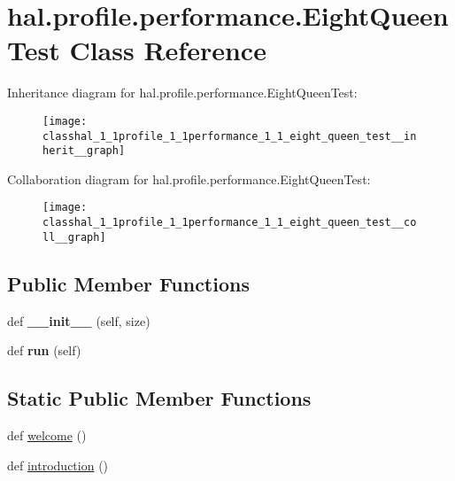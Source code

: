 \hypertarget{classhal_1_1profile_1_1performance_1_1_eight_queen_test}{}\section{hal.\+profile.\+performance.\+Eight\+Queen\+Test Class Reference}
\label{classhal_1_1profile_1_1performance_1_1_eight_queen_test}


Inheritance diagram for hal.\+profile.\+performance.\+Eight\+Queen\+Test\+:\nopagebreak
\begin{figure}[H]
\begin{center}
\leavevmode
\texttt{[image: classhal\_1\_1profile\_1\_1performance\_1\_1\_eight\_queen\_test\_\_inherit\_\_graph]}
\end{center}
\end{figure}


Collaboration diagram for hal.\+profile.\+performance.\+Eight\+Queen\+Test\+:\nopagebreak
\begin{figure}[H]
\begin{center}
\leavevmode
\texttt{[image: classhal\_1\_1profile\_1\_1performance\_1\_1\_eight\_queen\_test\_\_coll\_\_graph]}
\end{center}
\end{figure}
\subsection*{Public Member Functions}
\begin{DoxyCompactItemize}
\item 
def {\bfseries \+\_\+\+\_\+init\+\_\+\+\_\+} (self, size)\hypertarget{classhal_1_1profile_1_1performance_1_1_eight_queen_test_aff4c0640adbaf044ee1a2f1d20480647}{}\label{classhal_1_1profile_1_1performance_1_1_eight_queen_test_aff4c0640adbaf044ee1a2f1d20480647}

\item 
def {\bfseries run} (self)\hypertarget{classhal_1_1profile_1_1performance_1_1_eight_queen_test_a0f340ce684acbecc0ecec304907852c3}{}\label{classhal_1_1profile_1_1performance_1_1_eight_queen_test_a0f340ce684acbecc0ecec304907852c3}

\end{DoxyCompactItemize}
\subsection*{Static Public Member Functions}
\begin{DoxyCompactItemize}
\item 
def \hyperlink{classhal_1_1profile_1_1performance_1_1_eight_queen_test_a981be709c0e10f0098a8c58af1929746}{welcome} ()
\item 
def \hyperlink{classhal_1_1profile_1_1performance_1_1_eight_queen_test_a570aa1a773c9d24cca31e6a42e852fd4}{introduction} ()
\end{DoxyCompactItemize}
